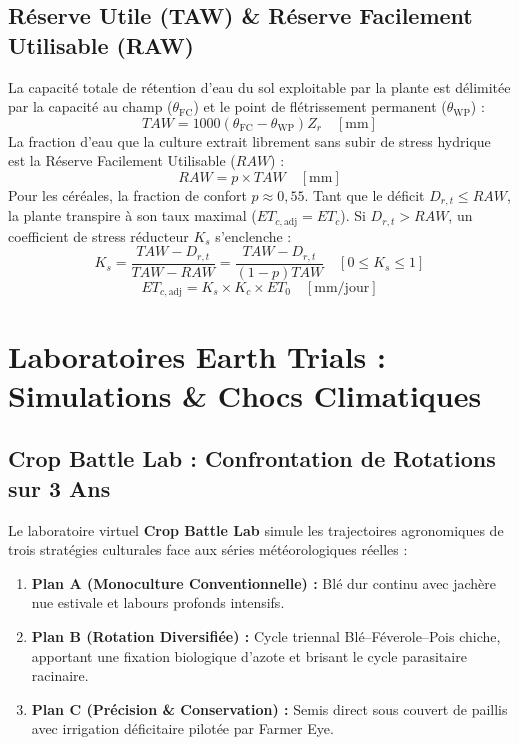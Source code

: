 \documentclass[11pt,a4paper,oneside]{report}
\begin{document}
\section{Réserve Utile (TAW) \& Réserve Facilement Utilisable (RAW)}
La capacité totale de rétention d'eau du sol exploitable par la plante est délimitée par la capacité au champ ($\theta_{\text{FC}}$) et le point de flétrissement permanent ($\theta_{\text{WP}}$) :
\begin{equation}
TAW = 1000 (\theta_{\text{FC}} - \theta_{\text{WP}}) Z_r \quad [\text{mm}]
\end{equation}
La fraction d'eau que la culture extrait librement sans subir de stress hydrique est la Réserve Facilement Utilisable ($RAW$) :
\begin{equation}
RAW = p \times TAW \quad [\text{mm}]
\end{equation}
Pour les céréales, la fraction de confort $p \approx 0,55$. Tant que le déficit $D_{r,t} \le RAW$, la plante transpire à son taux maximal ($ET_{c,\text{adj}} = ET_c$). Si $D_{r,t} > RAW$, un coefficient de stress réducteur $K_s$ s'enclenche :
\begin{equation}
K_s = \frac{TAW - D_{r,t}}{TAW - RAW} = \frac{TAW - D_{r,t}}{(1 - p) TAW} \quad [0 \le K_s \le 1]
\end{equation}
\begin{equation}
ET_{c,\text{adj}} = K_s \times K_c \times ET_0 \quad [\text{mm/jour}]
\end{equation}

\chapter{Laboratoires Earth Trials : Simulations \& Chocs Climatiques}

\section{Crop Battle Lab : Confrontation de Rotations sur 3 Ans}
Le laboratoire virtuel \textbf{Crop Battle Lab} simule les trajectoires agronomiques de trois stratégies culturales face aux séries météorologiques réelles :
\begin{enumerate}
    \item \textbf{Plan A (Monoculture Conventionnelle) :} Blé dur continu avec jachère nue estivale et labours profonds intensifs.
    \item \textbf{Plan B (Rotation Diversifiée) :} Cycle triennal Blé–Féverole–Pois chiche, apportant une fixation biologique d'azote et brisant le cycle parasitaire racinaire.
    \item \textbf{Plan C (Précision & Conservation) :} Semis direct sous couvert de paillis avec irrigation déficitaire pilotée par Farmer Eye.
\end{enumerate}
\end{document}
